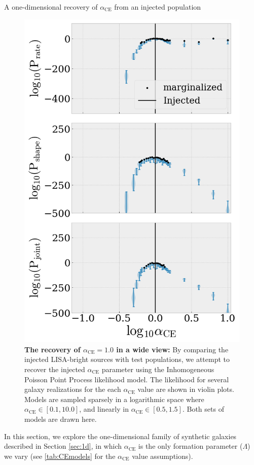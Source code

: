 \documentclass[twocolumn]{aastex631}
\newcommand*{\FormationParameters}{\Lambda}
\newcommand*{\alphaCE}{\alpha_{\mathrm{CE}}}
\begin{document}
\begin{subsection}{A one-dimensional recovery of $\alphaCE$ from an injected population}

\begin{figure}
\includegraphics[width=3.375 in]{CEb60_m12i-000_inj_likelihood_wide.png}
\caption{\label{fig:injection}
    \textbf{The recovery of $\alphaCE=1.0$ in a wide view:}
    By comparing the injected LISA-bright sources with
    test populations,
    we attempt to recover the injected $\alphaCE$ parameter
    using the Inhomogeneous Poisson Point Process likelihood model.
The likelihood for several galaxy realizations for the each $\alphaCE$
    value are shown in violin plots.
Models are sampled sparsely in a logarithmic space where 
    $\alphaCE \in [0.1,10.0]$,
    and linearly in $\alphaCE \in [0.5, 1.5]$.
Both sets of models are drawn here.
}
\end{figure}

In this section,
    we explore the one-dimensional family of synthetic galaxies described in
    Section \ref{sec:1d}, in which $\alphaCE$ is the only formation parameter
    ($\FormationParameters$) we vary (see \ref{tab:CEmodels} for the
    $\alphaCE$ value assumptions).


\end{subsection}
\end{document}
